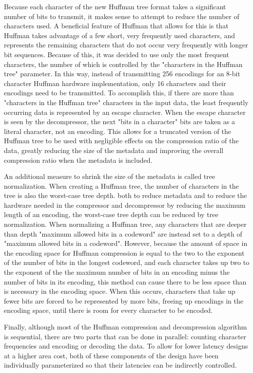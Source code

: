 \documentclass[doublespace,draft,nopageskip]{VTthesis} %
\begin{document}
Because each character of the new Huffman tree format takes a significant number of bits to transmit, it makes sense to attempt to reduce the number of characters used. A beneficial feature of Huffman that allows for this is that Huffman takes advantage of a few short, very frequently used characters, and represents the remaining characters that do not occur very frequently with longer bit sequences. Because of this, it was decided to use only the most frequent characters, the number of which is controlled by the "characters in the Huffman tree" parameter. In this way, instead of transmitting 256 encodings for an 8-bit character Huffman hardware implementation, only 16 characters and their encodings need to be transmitted. To accomplish this, if there are more than "characters in the Huffman tree" characters in the input data, the least frequently occurring data is represented by an escape character. When the escape character is seen by the decompressor, the next "bits in a character" bits are taken as a literal character, not an encoding. This allows for a truncated version of the Huffman tree to be used with negligible effects on the compression ratio of the data, greatly reducing the size of the metadata and improving the overall compression ratio when the metadata is included.

An additional measure to shrink the size of the metadata is called tree normalization. When creating a Huffman tree, the number of characters in the tree is also the worst-case tree depth. both to reduce metadata and to reduce the hardware needed in the compressor and decompressor by reducing the maximum length of an encoding, the worst-case tree depth can be reduced by tree normalization. When normalizing a Huffman tree, any characters that are deeper than depth "maximum allowed bits in a codeword" are instead set to a depth of "maximum allowed bits in a codeword". However, because the amount of space in the encoding space for Huffman compression is equal to the two to the exponent of the number of bits in the longest codeword, and each character takes up two to the exponent of the the maximum number of bits in an encoding minus the number of bits in its encoding, this method can cause there to be less space than is necessary in the encoding space. When this occurs, characters that take up fewer bits are forced to be represented by more bits, freeing up encodings in the encoding space, until there is room for every character to be encoded.

Finally, although most of the Huffman compression and decompression algorithm is sequential, there are two parts that can be done in parallel: counting character frequencies and encoding or decoding the data. To allow for lower latency designs at a higher area cost, both of these components of the design have been individually parameterized so that their latencies can be indirectly controlled.
\end{document}
